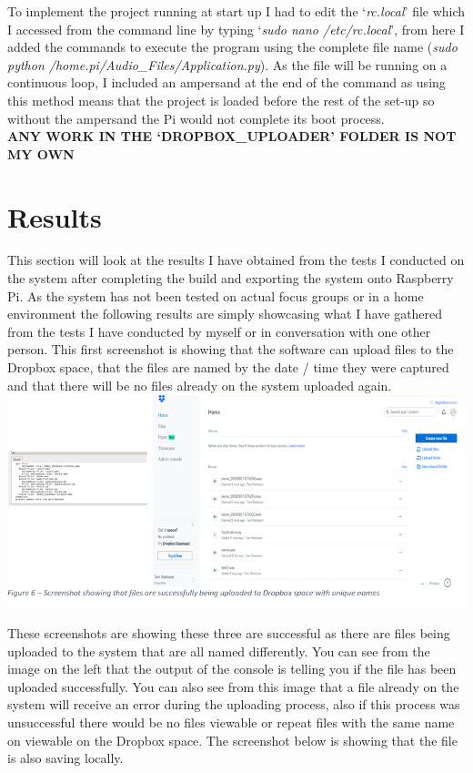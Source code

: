 \documentclass[a4paper,11pt]{report}
\begin{document}
To implement the project running at start up I had to edit the ‘\textit{rc.local}’ file which I accessed from the command line by typing ‘\textit{sudo nano /etc/rc.local}’, from here I added the commands to execute the program using the complete file name (\textit{sudo python /home.pi/Audio\_Files/Application.py}). As the file will be running on a continuous loop, I included an ampersand at the end of the command as using this method means that the project is loaded before the rest of the set-up so without the ampersand the Pi would not complete its boot process.\\

\textbf{ANY WORK IN THE ‘DROPBOX\_UPLOADER’ FOLDER IS NOT MY OWN}
	
\section{Results}
This section will look at the results I have obtained from the tests I conducted on the system after completing the build and exporting the system onto Raspberry Pi. As the system has not been tested on actual focus groups or in a home environment the following results are simply showcasing what I have gathered from the tests I have conducted by myself or in conversation with one other person. This first screenshot is showing that the software can upload files to the Dropbox space, that the files are named by the date / time they were captured and that there will be no files already on the system uploaded again.\\

\includegraphics{Screenshot1.PNG}

These screenshots are showing these three are successful as there are files being uploaded to the system that are all named differently. You can see from the image on the left that the output of the console is telling you if the file has been uploaded successfully. You can also see from this image that a file already on the system will receive an error during the uploading process, also if this process was unsuccessful there would be no files viewable or repeat files with the same name on viewable on the Dropbox space. The screenshot below is showing that the file is also saving locally.\\
\end{document}
